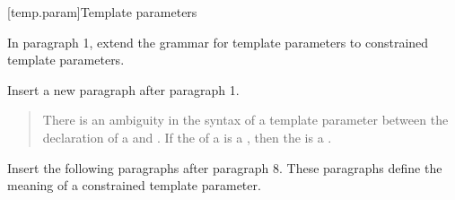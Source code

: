 [temp.param]{Template parameters}

In paragraph 1, extend the grammar for template parameters to 
constrained template parameters.

\begin{quote}
\pnum
\begin{bnf}

\end{bnf}
\end{quote}

Insert a new paragraph after paragraph 1.

\begin{quote}
\pnum
There is an ambiguity in the syntax of a template parameter between the
declaration of a  and 
.
% 
If the  of a  
is a , then the 
 is a .
\end{quote}

Insert the following paragraphs after paragraph 8. These paragraphs
define the meaning of a constrained template parameter.

